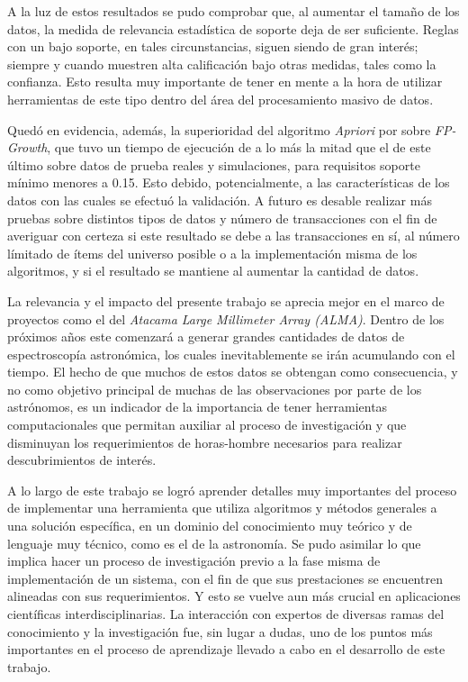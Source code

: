 \begin{conclusion}
A la luz de estos resultados se pudo comprobar que, al aumentar el tamaño de los datos, la medida de relevancia estadística de soporte deja de ser suficiente. Reglas con un bajo soporte, en tales circunstancias, siguen siendo de gran interés; siempre y cuando muestren alta calificación bajo otras medidas, tales como la confianza. Esto resulta muy importante de tener en mente a la hora de utilizar herramientas de este tipo dentro del área del procesamiento masivo de datos.

Quedó en evidencia, además, la superioridad del algoritmo \textit{Apriori} por sobre \textit{FP-Growth}, que tuvo un tiempo de ejecución de a lo más la mitad que el de este último sobre datos de prueba reales y simulaciones, para requisitos soporte mínimo menores a 0.15. Esto debido, potencialmente, a las características de los datos con las cuales se efectuó la validación. A futuro es desable realizar más pruebas sobre distintos tipos de datos y número de transacciones con el fin de averiguar con certeza si este resultado se debe a las transacciones en sí, al número límitado de ítems del universo posible o a la implementación misma de los algoritmos, y si el resultado se mantiene al aumentar la cantidad de datos.

La relevancia y el impacto del presente trabajo se aprecia mejor en el marco de proyectos como el del \textit{Atacama Large Millimeter Array (ALMA)}. Dentro de los próximos años este comenzará a generar grandes cantidades de datos de espectroscopía astronómica, los cuales inevitablemente se irán acumulando con el tiempo. El hecho de que muchos de estos datos se obtengan como consecuencia, y no como objetivo principal de muchas de las observaciones por parte de los astrónomos, es un indicador de la importancia de tener herramientas computacionales que permitan auxiliar al proceso de investigación y que disminuyan los requerimientos de horas-hombre necesarios para realizar descubrimientos de interés.

A lo largo de este trabajo se logró aprender detalles muy importantes del proceso de implementar una herramienta que utiliza algoritmos y métodos generales a una solución específica, en un dominio del conocimiento muy teórico y de lenguaje muy técnico, como es el de la astronomía. Se pudo asimilar lo que implica hacer un proceso de investigación previo a la fase misma de implementación de un sistema, con el fin de que sus prestaciones se encuentren alineadas con sus requerimientos. Y esto se vuelve aun más crucial en aplicaciones científicas interdisciplinarias. La interacción con expertos de diversas ramas del conocimiento y la investigación fue, sin lugar a dudas, uno de los puntos más importantes en el proceso de aprendizaje llevado a cabo en el desarrollo de este trabajo.


\end{conclusion}
